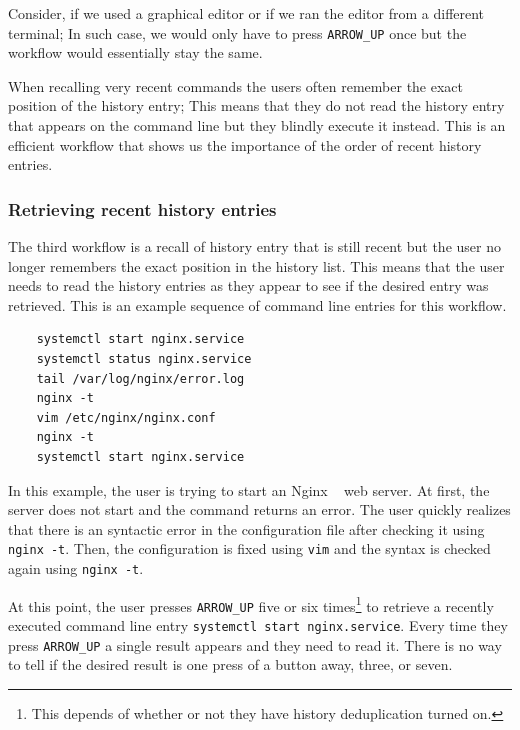 \documentclass[thesis=M,english]{FITthesis}[2012/10/20]
\newcommand{\redtext}[1]{\textcolor{red}{[[#1]]}}
\let\myCite\cite
\renewcommand\cite{\unskip~\myCite}
\begin{document}
Consider, if we used a graphical editor or if we ran the editor from a different terminal; In such case, we would only have to press \verb|ARROW_UP| once but the workflow would essentially stay the same.

When recalling very recent commands the users often remember the exact position of the history entry; This means that they do not read the history entry that appears on the command line but they blindly execute it instead. This is an efficient workflow that shows us the importance of the order of recent history entries.

\subsubsection*{Retrieving recent history entries}
The third workflow is a recall of history entry that is still recent but the user no longer remembers the exact position in the history list. This means that the user needs to read the history entries as they appear to see if the desired entry was retrieved. This is an example sequence of command line entries for this workflow.

\begin{verbatim}
    systemctl start nginx.service
    systemctl status nginx.service
    tail /var/log/nginx/error.log
    nginx -t
    vim /etc/nginx/nginx.conf
    nginx -t
    systemctl start nginx.service
\end{verbatim}

In this example, the user is trying to start an Nginx \cite{reese2008nginx} web server. At first, the server does not start and the command returns an error. The user quickly realizes that there is an syntactic error in the configuration file after checking it using \verb|nginx -t|. Then, the configuration is fixed using \verb|vim| and the syntax is checked again using \verb|nginx -t|. 

At this point, the user presses \verb|ARROW_UP| five or six times\footnote{This depends of whether or not they have history deduplication turned on.} to retrieve a recently executed command line entry \verb|systemctl start nginx.service|. Every time they press \verb|ARROW_UP| a single result appears and they need to read it. There is no way to tell if the desired result is one press of a button away, three, or seven. %


\end{document}
